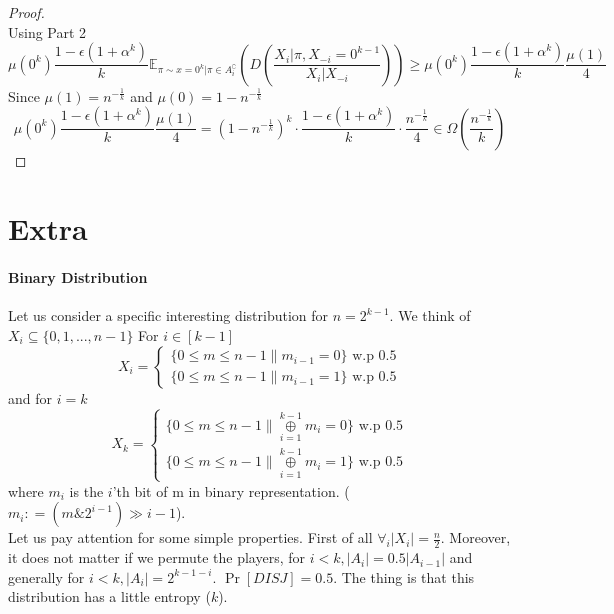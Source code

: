 \documentclass{article}
\theoremstyle{plain}
\begin{document}
\begin{proof}
\begin{equation*}
\end{equation*}
Using Part 2
\begin{equation*}
    \mu(0^k) \frac{1 - \epsilon (1 + \alpha ^k)}{k} \mathbb{E}_{\pi \sim x = 0^k| \pi \in A_{i}^\complement} \left( D\left(\frac{X_i | \pi, X_{-i} = 0^{k-1}}{X_i | X_{-i}} \right) \right) \geq \mu(0^k) \frac{1 - \epsilon (1 + \alpha ^k)}{k} \frac{\mu(1)}{4}
\end{equation*}
Since $\mu(1) = n^{-\frac{1}{k}}$ and $\mu(0) = 1 - n^{-\frac{1}{k}}$
\begin{equation*}
    \mu(0^k) \frac{1 - \epsilon (1 + \alpha ^k)}{k} \frac{\mu(1)}{4} = \left (1 - n^{-\frac{1}{k}} \right)^{k} \cdot \frac{1 - \epsilon (1 + \alpha ^k)}{k} \cdot \frac{n^{-\frac{1}{k}}}{4} \in \Omega\left(\frac{n^{-\frac{1}{k}}}{k}\right)
\end{equation*}
\end{proof}
\section{Extra}
\paragraph{Binary Distribution}
Let us consider a specific interesting distribution for $n = 2^{k-1}$. We think of $X_i \subseteq \{0, 1, ... , n-1\} $ \newline
For $i \in [k-1]$
  \[
    X_i=\left\{
                \begin{array}{ll}
                  \{0 \leq m \leq n-1 \| m_{i-1} = 0\} \text{ w.p 0.5} \\
                  \{0 \leq m \leq n-1 \| m_{i-1} = 1\} \text{ w.p 0.5}
                \end{array}
              \right.
  \]
and for $i = k$
  \[
    X_k=\left\{
                \begin{array}{ll}
                  \{0 \leq m \leq n-1 \| \underset{i=1}{\overset{k-1}{\oplus}} m_i = 0\} \text{ w.p 0.5} \\
                  \{0 \leq m \leq n-1 \| \underset{i=1}{\overset{k-1}{\oplus}} m_i = 1\} \text{ w.p 0.5}
                \end{array}
              \right.
  \]
where $m_i$ is the $i$'th bit of m in binary representation. ($m_i \mathrel{\mathop:}= ( m \mathop{\&} 2^{i-1} ) \gg i-1 $). \\
Let us pay attention for some simple properties. First of all $\forall_i |X_i| = \frac{n}{2}$. Moreover, it does not matter if we permute the players, for $i < k, |A_i| = 0.5|A_{i-1}|$ and generally for $i < k, |A_i| = 2^{k-1-i}$. $\Pr[DISJ] = 0.5$. The thing is that this distribution has a little entropy ($k$).
\end{document}
